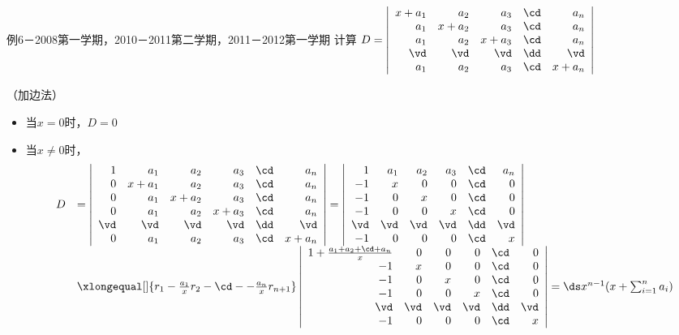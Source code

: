 \begin{frame}
  \begin{footnotesize}
    \begin{exampleblock}{例6－2008第一学期，2010－2011第二学期，2011－2012第一学期}
      计算
      $
      D=\left|
      \begin{array}{rrrrr}
        x+a_1&a_2&a_3&\cd&a_n\\
        a_1&x+a_2&a_3&\cd&a_n\\
        a_1&a_2&x+a_3&\cd&a_n\\
        \vd&\vd&\vd&\dd&\vd\\
        a_1&a_2&a_3&\cd&x+a_n
      \end{array}
      \right|
      $
    \end{exampleblock}
    \end{footnotesize}

  \begin{tiny}
    \pause\jiename（加边法）
    \begin{itemize}
    \item 当$x=0$时，$D=0$
    \item 当$x\ne 0$时，
      $$
    \begin{array}{rl}
            D&=\left|
      \begin{array}{rrrrrr}
        1&a_1&a_2&a_3&\cd&a_n\\
        0&x+a_1&a_2&a_3&\cd&a_n\\
        0&a_1&x+a_2&a_3&\cd&a_n\\
        0&a_1&a_2&x+a_3&\cd&a_n\\
        \vd&\vd&\vd&\vd&\dd&\vd\\
        0&a_1&a_2&a_3&\cd&x+a_n
      \end{array}      \right|=\left|
      \begin{array}{rrrrrr}
        1&a_1&a_2&a_3&\cd&a_n\\
        -1&x&0&0&\cd&0\\
        -1&0&x&0&\cd&0\\
        -1&0&0&x&\cd&0\\
        \vd&\vd&\vd&\vd&\dd&\vd\\
        -1&0&0&0&\cd&x
      \end{array}
      \right|\\[0.4in]
      &\xlongequal[]{r_1-\frac{a_1}xr_2-\cd--\frac{a_n}xr_{n+1}}
      \left|
      \begin{array}{rrrrrr}
        1+\frac{a_1+a_2+\cd+a_n}x&0&0&0&\cd&0\\
        -1&x&0&0&\cd&0\\
        -1&0&x&0&\cd&0\\
        -1&0&0&x&\cd&0\\
        \vd&\vd&\vd&\vd&\dd&\vd\\
        -1&0&0&0&\cd&x
      \end{array}
      \right|=\ds x^{n-1}(x+\sum_{i=1}^na_i)
    \end{array}
      $$
    \end{itemize}
  \end{tiny}
\end{frame}


